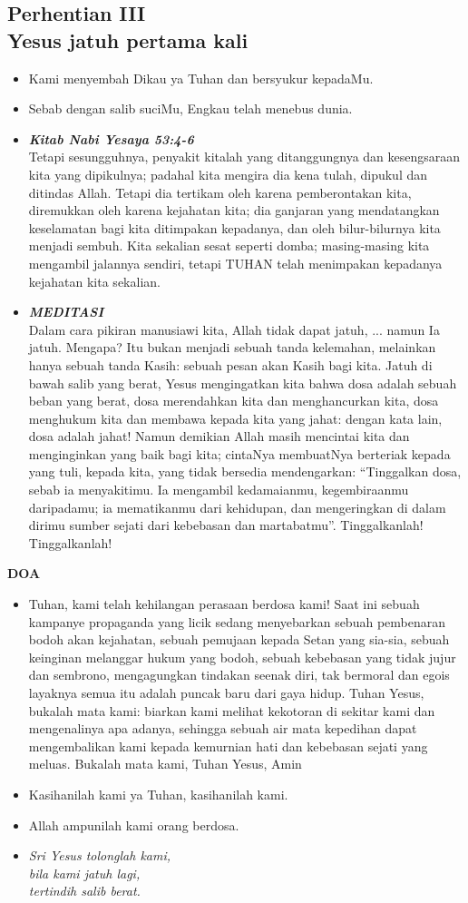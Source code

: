 \documentclass[a5paper,titlepage,11pt,openany]{scrbook}
\newcommand{\BU}[1]{\begin{itemize} \item[U:] #1 \end{itemize}}
\newcommand{\BP}[1]{\begin{itemize} \item[P:] #1 \end{itemize}}
\newcommand{\kamiMenyembah}{\BP{ Kami menyembah Dikau ya Tuhan dan bersyukur kepadaMu.}
\BU{Sebab dengan salib suciMu, Engkau telah menebus dunia.}
}
\newcommand{\kasihanilahKami}{\BP{Kasihanilah kami ya Tuhan, kasihanilah kami.}
\BU{Allah ampunilah kami orang berdosa.}}
\newcommand{\BPi}[2]
{\begin{itemize} \item[P1:] \textbf{\emph{#1}}\\#2 \end{itemize}}
\newcommand{\BPii}[1]
{\begin{itemize} \item[P2:] \textbf{\emph{MEDITASI}}\\#1 \end{itemize}}
\newcommand{\lagu}[2]{%
\begin{itemize}
\item[#1.] \it{#2}
\end{itemize}}
\newcommand{\henti}[2]{%
\subsection*{Perhentian #1\\#2 } 
\kamiMenyembah
}
\begin{document}
\henti{III}{Yesus jatuh pertama kali}

\BPi{Kitab Nabi Yesaya 53:4-6 }{Tetapi sesungguhnya, penyakit kitalah yang ditanggungnya dan kesengsaraan kita yang dipikulnya; padahal kita mengira dia kena tulah, dipukul dan ditindas Allah. Tetapi dia tertikam oleh karena pemberontakan kita, diremukkan oleh karena kejahatan kita; dia ganjaran yang mendatangkan keselamatan bagi kita ditimpakan kepadanya, dan oleh bilur-bilurnya kita menjadi sembuh. Kita sekalian sesat seperti domba; masing-masing kita mengambil jalannya sendiri, tetapi TUHAN telah menimpakan kepadanya kejahatan kita sekalian.}





\BPii{
Dalam cara pikiran manusiawi kita, Allah tidak dapat jatuh, ... namun Ia jatuh. Mengapa? Itu bukan menjadi sebuah tanda kelemahan, melainkan hanya sebuah tanda Kasih: sebuah pesan akan Kasih bagi kita. Jatuh di bawah salib yang berat, Yesus mengingatkan kita bahwa dosa adalah sebuah beban yang berat, dosa merendahkan kita dan menghancurkan kita, dosa menghukum kita dan membawa kepada kita yang jahat: dengan kata lain, dosa adalah jahat!  Namun demikian Allah masih mencintai kita dan menginginkan yang baik bagi kita; cintaNya membuatNya berteriak kepada yang tuli, kepada kita, yang tidak bersedia mendengarkan: ``Tinggalkan dosa, sebab ia menyakitimu. Ia mengambil kedamaianmu, kegembiraanmu daripadamu; ia mematikanmu dari kehidupan, dan mengeringkan di dalam dirimu sumber sejati dari kebebasan dan martabatmu''. Tinggalkanlah! Tinggalkanlah!}

\textbf{DOA}

\BU{Tuhan, kami telah kehilangan perasaan berdosa kami! Saat ini sebuah kampanye propaganda yang licik sedang menyebarkan sebuah pembenaran bodoh akan kejahatan, sebuah pemujaan kepada Setan yang sia-sia, sebuah keinginan melanggar hukum yang bodoh, sebuah kebebasan yang tidak jujur dan sembrono, mengagungkan tindakan seenak diri, tak bermoral dan egois layaknya semua itu adalah puncak baru dari gaya hidup. Tuhan Yesus, bukalah mata kami: biarkan kami melihat kekotoran di sekitar kami dan mengenalinya apa adanya, sehingga sebuah air mata kepedihan dapat mengembalikan kami kepada kemurnian hati dan kebebasan sejati yang meluas. Bukalah mata kami, Tuhan Yesus, Amin}

\kasihanilahKami

\lagu{4}{Sri Yesus tolonglah kami,\\
bila kami jatuh lagi,\\
tertindih salib berat.}
\end{document}
